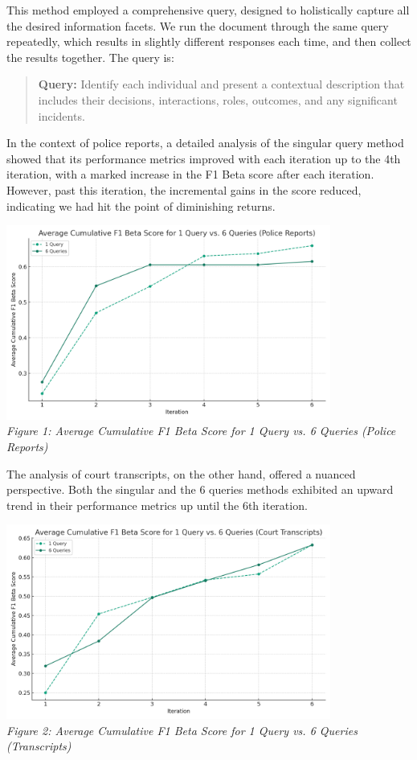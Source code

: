 \documentclass{article}
\begin{document}
This method employed a comprehensive query, designed to holistically capture all the desired information facets. We run the document through the same query repeatedly, which results in slightly different responses each time, and then collect the results together. The query is:

\begin{quote}
\textbf{Query:} Identify each individual and present a contextual description that includes their decisions, interactions, roles, outcomes, and any significant incidents.
\end{quote}

In the context of police reports, a detailed analysis of the singular query method showed that its performance metrics improved with each iteration up to the 4th iteration, with a marked increase in the F1 Beta score after each iteration. However, past this iteration, the incremental gains in the score reduced, indicating we had hit the point of diminishing returns.

\begin{center}
    \includegraphics[width=0.8\textwidth]{data/avg_cum_fbeta_police_reports.png}
    \\
    \textit{Figure 1: Average Cumulative F1 Beta Score for 1 Query vs. 6 Queries (Police Reports)}
\end{center}

The analysis of court transcripts, on the other hand, offered a nuanced perspective. Both the singular and the 6 queries methods exhibited an upward trend in their performance metrics up until the 6th iteration.

\begin{center}
    \includegraphics[width=0.8\textwidth]{data/avg_cum_fbeta_court_transcripts.png}
    \\
    \textit{Figure 2: Average Cumulative F1 Beta Score for 1 Query vs. 6 Queries (Transcripts)}
\end{center}
\end{document}
